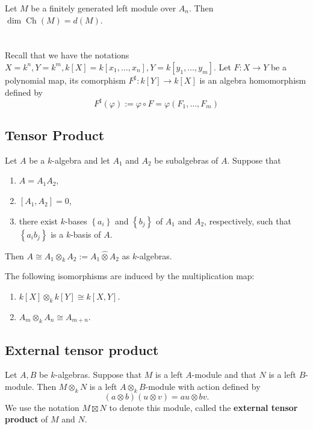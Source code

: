 \documentclass[12pt, oneside]{book}
\begin{document}
\begin{theorem}
    Let $M$ be a finitely generated left module over $A_n$. Then $\operatorname{dim} \operatorname{Ch}(M)=d(M)$.
\end{theorem}

\chapter{}

Recall that we have the notations $X=k^n,Y=k^m, k[X]=k[x_1, \ldots, x_n],Y=k[y_1, \ldots, y_m]$.
Let $F: X \rightarrow Y$ be a polynomial map,
its comorphism $F^{\sharp}: k[Y] \rightarrow k[X]$ is an algebra homomorphism defined by
\begin{equation*}
    F^{\sharp}(\varphi)
    :=
    \varphi \circ F
    =
    \varphi\left(F_1, \ldots, F_m\right)
\end{equation*}


\section{Tensor Product}
\begin{proposition}
    Let $A$ be a $k$-algebra and let $A_1$ and $A_2$ be subalgebras of $A$. Suppose that
    \begin{enumerate}[label=(\roman*)]
        \item
              $A=A_1 A_2$,
        \item     $[A_1, A_2]=0$,
        \item
              there exist $k$-bases $\left\{a_i\right\}$ and $\left\{b_j\right\}$ of $A_1$ and $A_2$, respectively, such that $\left\{a_i b_j\right\}$ is a $k$-basis of $A$.
    \end{enumerate}
    Then $A \cong A_1\otimes_k A_2:= A_1 \widehat{\otimes} A_2$ as $k$-algebras.
\end{proposition}
\begin{corollary}
    The following isomorphisms are induced by the multiplication map:
    \begin{enumerate}
        \item
              $k[X] \otimes_k k[Y] \cong k[X, Y]$.
        \item
              $A_m \otimes_k A_n \cong A_{m+n}$.
    \end{enumerate}
\end{corollary}

\section{External tensor product}
\begin{definition}
    Let $A, B$ be $k$-algebras. Suppose that $M$ is a left $A$-module and that $N$ is a left $B$-module.
    Then $M\otimes_k N$ is a left $A \otimes_k B$-module with action defined by
    \begin{equation*}
        (a \otimes b)(u \otimes v)=a u \otimes b v .
    \end{equation*}
    We use the notation $M \boxtimes N$ to denote this module, called the \textbf{external tensor product} of $M$ and $N$.
\end{definition}
\end{document}
